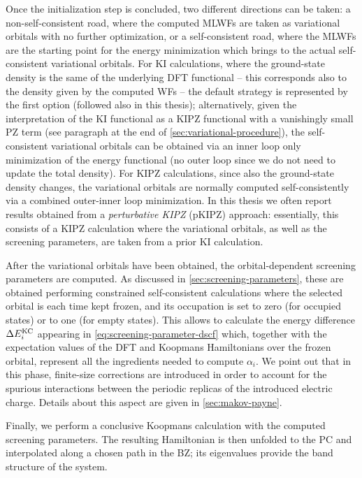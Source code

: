 Once the initialization step is concluded, two different directions can be taken: a non-self-consistent road, where the computed MLWFs are taken as variational orbitals with no further optimization, or a self-consistent road, where the MLWFs are the starting point for the energy minimization which brings to the actual self-consistent variational orbitals. For KI calculations, where the ground-state density is the same of the underlying DFT functional -- this corresponds also to the density given by the computed WFs -- the default strategy is represented by the first option (followed also in this thesis); alternatively, given the interpretation of the KI functional as a KIPZ functional with a vanishingly small PZ term (see paragraph at the end of \cref{sec:variational-procedure}), the self-consistent variational orbitals can be obtained via an inner loop only minimization of the energy functional (no outer loop since we do not need to update the total density). For KIPZ calculations, since also the ground-state density changes, the variational orbitals are normally computed self-consistently via a combined outer-inner loop minimization. In this thesis we often report results obtained from a \emph{perturbative KIPZ} (pKIPZ) approach: essentially, this consists of a KIPZ calculation where the variational orbitals, as well as the screening parameters, are taken from a prior KI calculation.

After the variational orbitals have been obtained, the orbital-dependent screening parameters are computed. As discussed in \cref{sec:screening-parameters}, these are obtained performing constrained self-consistent calculations where the selected orbital is each time kept frozen, and its occupation is set to zero (for occupied states) or to one (for empty states). This allows to calculate the energy difference $\Delta E^{\rm KC}_i$ appearing in \cref{eq:screening-parameter-dscf} which, together with the expectation values of the DFT and Koopmans Hamiltonians over the frozen orbital, represent all the ingredients needed to compute $\alpha_i$. We point out that in this phase, finite-size corrections are introduced in order to account for the spurious interactions between the periodic replicas of the introduced electric charge. Details about this aspect are given in \cref{sec:makov-payne}.

Finally, we perform a conclusive Koopmans calculation with the computed screening parameters. The resulting Hamiltonian is then unfolded to the PC and interpolated along a chosen path in the BZ; its eigenvalues provide the band structure of the system.

